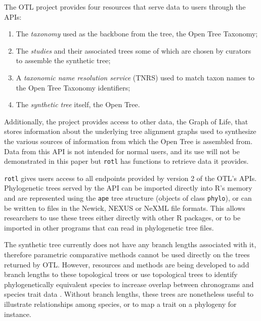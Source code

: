 \documentclass[12pt,letterpaper]{article}\usepackage[]{graphicx}\usepackage[]{color}
\begin{document}
The OTL project provides four resources that serve data to users through the
APIs:

\begin{enumerate}
\item The \emph{taxonomy} used as the backbone from the tree, the Open Tree
  Taxonomy;
\item The \emph{studies} and their associated trees some of which are chosen by
  curators to assemble the synthetic tree;
\item A \emph{taxonomic name resolution service} (TNRS) used to match taxon
  names to the Open Tree Taxonomy identifiers;
\item The \emph{synthetic tree} itself, the Open Tree.
\end{enumerate}

Additionally, the project provides access to other data, the Graph of Life, that
stores information about the underlying tree alignment graphs \citep{Smith2013}
used to synthesize the various sources of information from which the Open Tree
is assembled from. Data from this API is not intended for normal users, and its
use will not be demonstrated in this paper but \texttt{rotl} has functions to
retrieve data it provides.

\texttt{rotl} gives users access to all endpoints provided by version 2 of the
OTL's APIs. Phylogenetic trees served by the API can be imported directly into
R's memory and are represented using the \texttt{ape} \citep{Paradis2004} tree
structure (objects of class \texttt{phylo}), or can be written to files in the
Newick, NEXUS \citep{Maddison1997} or NeXML \citep{Vos2012} file formats. This
allows researchers to use these trees either directly with other R packages, or
to be imported in other programs that can read in phylogenetic tree files.

The synthetic tree currently does not have any branch lengths associated with
it, therefore parametric comparative methods cannot be used directly on the
trees returned by OTL. However, resources and methods are being developed to add
branch lengths to these topological trees \citep[e.g.,][]{Ksepka2015} or use
topological trees to identify phylogenetically equivalent species to increase
overlap between chronograms and species trait data \citep{Pennell2015}. Without
branch lengths, these trees are nonetheless useful to illustrate relationships
among species, or to map a trait on a phylogeny for instance.

\end{document}
